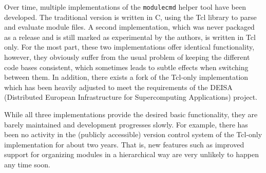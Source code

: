 Over time, multiple implementations of the \texttt{modulecmd} helper tool
have been developed. The traditional version is written in C, using the Tcl
library to parse and evaluate module files. A second implementation, which
was never packaged as a release and is still marked as experimental by the
authors, is written in Tcl only. For the most part, these two implementations
offer identical functionality, however, they obviously suffer from the usual
problem of keeping the different code bases consistent, which sometimes leads
to subtle effects when switching between them. In addition, there exists a
fork of the Tcl-only implementation which has been heavily adjusted to meet
the requirements of the DEISA (Distributed European Infrastructure for
Supercomputing Applications) project.


While all three implementations provide the desired basic functionality, they
are barely maintained and development progresses slowly. For example, there
has been no activity in the (publicly accessible) version control system of
the Tcl-only implementation for about two years. That is, new features such
as improved support for organizing modules in a hierarchical way are very
unlikely to happen any time soon.




